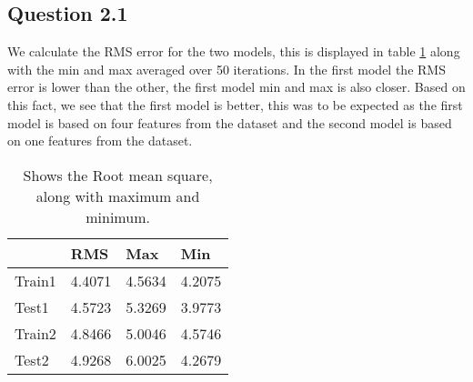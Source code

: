 \subsection*{Question 2.1}

We calculate the RMS error for the two models, this is displayed in
table \ref{tab:q21} along with the min and max averaged over 50
iterations. In the first model the RMS error is lower than the other,
the first model min and max is also closer. Based on this fact, we see
that the first model is better, this was to be expected as the first
model is based on four features from the dataset and the second model
is based on one features from the dataset.

\begin{table}[!htbp]
  \centering
  \begin{tabular}{| l | l | l | l |}
    \hline
    {}		& RMS		& Max		& Min \\
    \hline
    Train1	& 4.4071	& 4.5634	& 4.2075 \\
    \hline
    Test1	& 4.5723	& 5.3269	& 3.9773 \\
    \hline
    Train2	& 4.8466	& 5.0046	& 4.5746 \\
    \hline
    Test2	& 4.9268	& 6.0025	& 4.2679 \\
    \hline
  \end{tabular}
  \caption{Shows the Root mean square, along with maximum and minimum.}
  \label{tab:q21}
\end{table}
